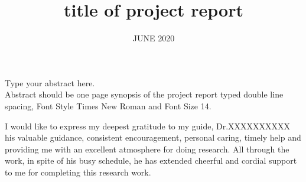 \documentclass[BTech]{srmuthesis}
\begin{document}

\title{title of project report} %

\firstauthorregno{[Reg No: 16305011]}
\secondauthorregno{[Reg No: 16305015]}
\thirdauthorregno{[Reg No: 16305264]}
\fourthauthorregno{[Reg No: 16305456]}
\fifthauthor{}
\fifthauthorregno{}
\date{JUNE 2020} %

\maketitle
\certificate





\abstract
\begin{doublespacing}
{\large\noindent Type your abstract here.\\

 Abstract should be one page synopsis of the project report typed double line spacing, Font Style Times New Roman and Font Size 14.}
\end{doublespacing}

\pagebreak
\acknowledgements
I would like to express my deepest gratitude to my guide, Dr.XXXXXXXXXX
his valuable guidance, consistent encouragement, personal caring, timely help and providing me with an excellent atmosphere for doing research. All through the work, in spite of his busy schedule, he has extended cheerful and cordial support to me for completing this research work.\\
\end{document}
